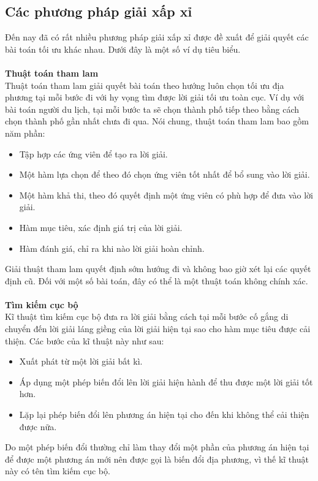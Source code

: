 \subsection{Các phương pháp giải xấp xỉ}
Đến nay đã có rất nhiều phương pháp giải xấp xỉ được đề xuất để giải quyết các bài toán tối ưu khác nhau. Dưới đây là một số ví dụ tiêu biểu.
\\ \\\textbf{Thuật toán tham lam }
\\Thuật toán tham lam giải quyết bài toán theo hướng luôn chọn tối ưu địa phương tại mỗi bước đi với hy vọng tìm được lời giải tối ưu toàn cục. Ví dụ với bài toán người du lịch, tại mỗi bước ta sẽ chọn thành phố tiếp theo bằng cách chọn thành phố gần nhất chưa đi qua.
Nói chung, thuật toán tham lam bao gồm năm phần:
\begin{itemize}
    \item Tập hợp các ứng viên để tạo ra lời giải. 
    \item Một hàm lựa chọn để theo đó chọn ứng viên tốt nhất để bổ sung vào lời giải.
    \item Một hàm khả thi, theo đó quyết định một ứng viên có phù hợp để đưa vào lời giải.
    \item Hàm mục tiêu, xác định giá trị của lời giải.
    \item Hàm đánh giá, chỉ ra khi nào lời giải hoàn chỉnh.
\end{itemize}
Giải thuật tham lam quyết định sớm hướng đi và không bao giờ xét lại các quyết định cũ. Đối với một số bài toán, đây có thể là một thuật toán không chính xác.
\\ \\\textbf{Tìm kiếm cục bộ}
\\Kĩ thuật tìm kiếm cục bộ đưa ra lời giải bằng cách tại mỗi bước cố gắng di chuyển đến lời giải láng giềng của lời giải hiện tại sao cho hàm mục tiêu được cải thiện. Các bước của kĩ thuật này như sau:
\begin{itemize}
    \item Xuất phát từ một lời giải bất kì. 
    \item Áp dụng một phép biến đổi lên lời giải hiện hành để thu được một lời giải tốt hơn. 
    \item Lặp lại phép biến đổi lên phương án hiện tại cho đến khi không thể cải thiện được nữa.
\end{itemize}
Do một phép biến đổi thường chỉ làm thay đổi một phần của phương án hiện tại để được một phương án mới nên được gọi là biến đổi địa phương, vì thế kĩ thuật này có tên tìm kiếm cục bộ.
